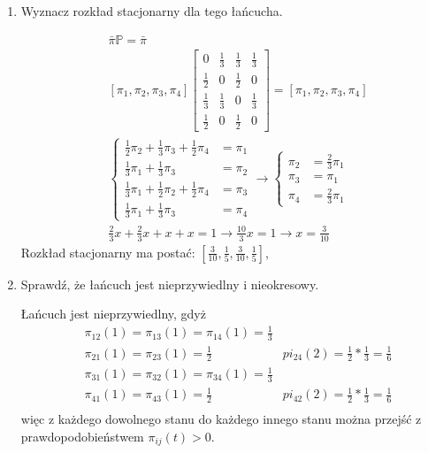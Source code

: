 \documentclass[a4paper,12pt]{article}
\theoremstyle{definition}%
\theoremstyle{definition}
\theoremstyle{problem}
\begin{document}
\begin{enumerate}[label=\alph*)]
\item Wyznacz rozkład stacjonarny dla tego łańcucha.

\begin{align*}
&\bar{\pi}\mathbb{P}=\bar{\pi}\\
&\left[\pi _1, \pi _2,\pi _3,\pi _4\right]\begin{bmatrix}
0&\frac{1}{3}&\frac{1}{3}&\frac{1}{3}\\
\frac{1}{2}&0&\frac{1}{2}&0\\
\frac{1}{3}&\frac{1}{3}&0&\frac{1}{3}\\
\frac{1}{2}&0&\frac{1}{2}&0
\end{bmatrix}=\left[\pi _1, \pi _2,\pi _3,\pi _4\right]\\
&\left\{\begin{matrix}
\frac{1}{2}\pi _2 + \frac{1}{3}\pi _3+\frac{1}{2}\pi _4&=\pi _1\\
\frac{1}{3}\pi _1+\frac{1}{3}\pi _3&=\pi _2\\
\frac{1}{3}\pi _1+\frac{1}{2}\pi _2 +\frac{1}{2}\pi _4&=\pi _3\\
\frac{1}{3}\pi _1+\frac{1}{3}\pi _3&=\pi _4
\end{matrix}\right.\rightarrow \left\{\begin{matrix}
\pi _2 &= \frac{2}{3}\pi _1\\
\pi _3 &= \pi _1\\
\pi _4 &= \frac{2}{3}\pi _1
\end{matrix}\right.\\
&\frac{2}{3}x+\frac{2}{3}x+x+x=1\rightarrow \frac{10}{3}x=1\rightarrow x = \frac{3}{10}
\end{align*}
Rozkład stacjonarny ma postać: $\left[\frac{3}{10},\frac{1}{5},\frac{3}{10},\frac{1}{5}\right]$, 
\item Sprawdź, że łańcuch jest nieprzywiedlny i nieokresowy.

Łańcuch jest nieprzywiedlny, gdyż 
\begin{align*}
&\pi _{12}(1)=\pi _{13}(1)=\pi _{14}(1)=\frac{1}{3}\\
&\pi _{21}(1)=\pi _{23}(1)=\frac{1}{2} & pi _{24}(2)=\frac{1}{2}*\frac{1}{3}=\frac{1}{6}\\
&\pi _{31}(1)=\pi _{32}(1)=\pi _{34}(1)=\frac{1}{3}\\
&\pi _{41}(1)=\pi _{43}(1)=\frac{1}{2} & pi _{42}(2)=\frac{1}{2}*\frac{1}{3}=\frac{1}{6}\\
\end{align*}
więc z każdego dowolnego stanu do każdego innego stanu można przejść z prawdopodobieństwem $\pi _{ij}(t)>0$.


\end{enumerate}
\end{document}
